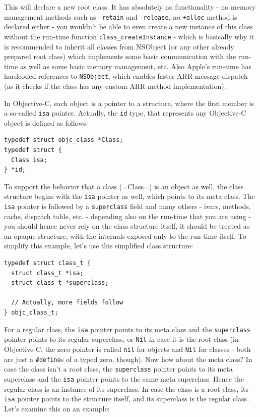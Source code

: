 This will declare a new root class. It has absolutely no functionality - no memory management methods such as \verb=-retain= and \verb=-release=, no \verb=+alloc= method is declared either - you wouldn't be able to even create a new instance of this class without the run-time function \verb=class_createInstance= - which is basically why it is recommended to inherit all classes from NSObject (or any other already prepared root class) which implements some basic communication with the run-time as well as some basic memory management, etc. Also Apple's run-time has hardcoded references to \verb=NSObject=, which enables faster ARR message dispatch (as it checks if the class has any custom ARR-method implementation).

In Objective-C, each object is a pointer to a structure, where the first member is a so-called \verb=isa= pointer. Actually, the \verb=id= type, that represents any Objective-C object is defined as follows:

\begin{verbatim}
typedef struct objc_class *Class;
typedef struct {
  Class isa;
} *id;
\end{verbatim}

To support the behavior that a class (\ver=Class=) is an object as well, the class structure begins with the \verb=isa= pointer as well, which points to its meta class. The \verb=isa= pointer is followed by a \verb=superclass= field and many others - ivars, methods, cache, dispatch table, etc. - depending also on the run-time that you are using - you should hence never rely on the class structure itself, it should be treated as an opaque structure, with the internals exposed only to the run-time itself. To simplify this example, let's use this simplified class structure:

\begin{verbatim}
typedef struct class_t {
  struct class_t *isa;
  struct class_t *superclass;
  
  // Actually, more fields follow
} objc_class_t;
\end{verbatim}

For a regular class, the \verb=isa= pointer points to its meta class and the \verb=superclass= pointer points to its regular superclass, or \verb=Nil= in case it is the root class (in Objective-C, the zero pointer is called \verb=nil= for objects and \verb=Nil= for classes - both are just a \verb=#define=s of a typed zero, though). Now how about the meta class?
In case the class isn't a root class, the \verb=superclass= pointer points to its meta superclass and the \verb=isa= pointer points to the same meta superclass. Hence the regular class is an instance of its superclass. In case the class is a root class, its \verb=isa= pointer points to the structure itself, and its superclass is the regular class. Let's examine this on an example:

